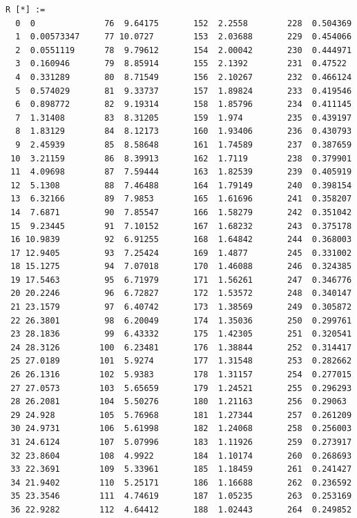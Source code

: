 \documentclass{article}
\begin{document}
\begin{verbatim}
R [*] :=
  0  0              76  9.64175       152  2.2558        228  0.504369
  1  0.00573347     77 10.0727        153  2.03688       229  0.454066
  2  0.0551119      78  9.79612       154  2.00042       230  0.444971
  3  0.160946       79  8.85914       155  2.1392        231  0.47522
  4  0.331289       80  8.71549       156  2.10267       232  0.466124
  5  0.574029       81  9.33737       157  1.89824       233  0.419546
  6  0.898772       82  9.19314       158  1.85796       234  0.411145
  7  1.31408        83  8.31205       159  1.974         235  0.439197
  8  1.83129        84  8.12173       160  1.93406       236  0.430793
  9  2.45939        85  8.58648       161  1.74589       237  0.387659
 10  3.21159        86  8.39913       162  1.7119        238  0.379901
 11  4.09698        87  7.59444       163  1.82539       239  0.405919
 12  5.1308         88  7.46488       164  1.79149       240  0.398154
 13  6.32166        89  7.9853        165  1.61696       241  0.358207
 14  7.6871         90  7.85547       166  1.58279       242  0.351042
 15  9.23445        91  7.10152       167  1.68232       243  0.375178
 16 10.9839         92  6.91255       168  1.64842       244  0.368003
 17 12.9405         93  7.25424       169  1.4877        245  0.331002
 18 15.1275         94  7.07018       170  1.46088       246  0.324385
 19 17.5463         95  6.71979       171  1.56261       247  0.346776
 20 20.2246         96  6.72827       172  1.53572       248  0.340147
 21 23.1579         97  6.40742       173  1.38569       249  0.305872
 22 26.3801         98  6.20049       174  1.35036       250  0.299761
 23 28.1836         99  6.43332       175  1.42305       251  0.320541
 24 28.3126        100  6.23481       176  1.38844       252  0.314417
 25 27.0189        101  5.9274        177  1.31548       253  0.282662
 26 26.1316        102  5.9383        178  1.31157       254  0.277015
 27 27.0573        103  5.65659       179  1.24521       255  0.296293
 28 26.2081        104  5.50276       180  1.21163       256  0.29063
 29 24.928         105  5.76968       181  1.27344       257  0.261209
 30 24.9731        106  5.61998       182  1.24068       258  0.256003
 31 24.6124        107  5.07996       183  1.11926       259  0.273917
 32 23.8604        108  4.9922        184  1.10174       260  0.268693
 33 22.3691        109  5.33961       185  1.18459       261  0.241427
 34 21.9402        110  5.25171       186  1.16688       262  0.236592
 35 23.3546        111  4.74619       187  1.05235       263  0.253169
 36 22.9282        112  4.64412       188  1.02443       264  0.249852

\end{verbatim}
\end{document}
